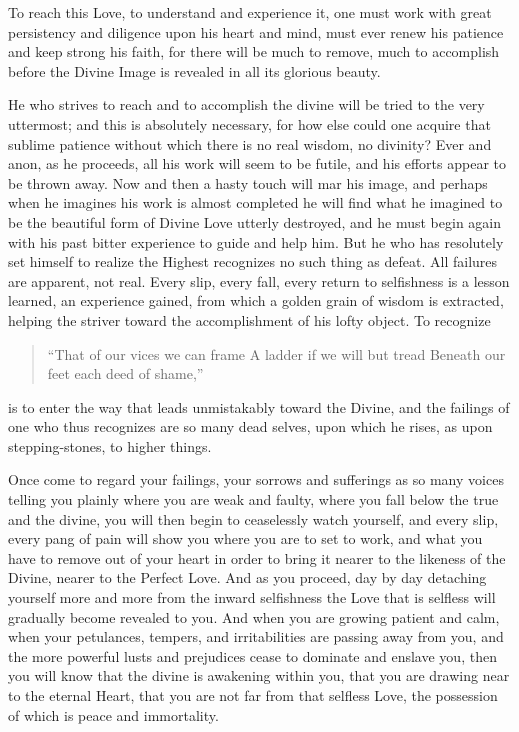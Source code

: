 \documentclass[12pt,oneside]{scrbook}
\begin{document}
  To reach this Love, to understand and experience it, one must work with
  great persistency and diligence upon his heart and mind, must ever renew
  his patience and keep strong his faith, for there will be much to
  remove, much to accomplish before the Divine Image is revealed in all
  its glorious beauty.
  
  He who strives to reach and to accomplish the divine will be tried to
  the very uttermost; and this is absolutely necessary, for how else could
  one acquire that sublime patience without which there is no real wisdom,
  no divinity? Ever and anon, as he proceeds, all his work will seem to be
  futile, and his efforts appear to be thrown away. Now and then a hasty
  touch will mar his image, and perhaps when he imagines his work is
  almost completed he will find what he imagined to be the beautiful form
  of Divine Love utterly destroyed, and he must begin again with his past
  bitter experience to guide and help him. But he who has resolutely set
  himself to realize the Highest recognizes no such thing as defeat. All
  failures are apparent, not real. Every slip, every fall, every return to
  selfishness is a lesson learned, an experience gained, from which a
  golden grain of wisdom is extracted, helping the striver toward the
  accomplishment of his lofty object. To recognize
  
  \begin{quote}
  ``That of our vices we can frame A ladder if we will but tread Beneath
  our feet each deed of shame,''
  \end{quote}
  
  is to enter the way that leads unmistakably toward the Divine, and the
  failings of one who thus recognizes are so many dead selves, upon which
  he rises, as upon stepping-stones, to higher things.
  
  Once come to regard your failings, your sorrows and sufferings as so
  many voices telling you plainly where you are weak and faulty, where you
  fall below the true and the divine, you will then begin to ceaselessly
  watch yourself, and every slip, every pang of pain will show you where
  you are to set to work, and what you have to remove out of your heart in
  order to bring it nearer to the likeness of the Divine, nearer to the
  Perfect Love. And as you proceed, day by day detaching yourself more and
  more from the inward selfishness the Love that is selfless will
  gradually become revealed to you. And when you are growing patient and
  calm, when your petulances, tempers, and irritabilities are passing away
  from you, and the more powerful lusts and prejudices cease to dominate
  and enslave you, then you will know that the divine is awakening within
  you, that you are drawing near to the eternal Heart, that you are not
  far from that selfless Love, the possession of which is peace and
  immortality.
  
\end{document}

